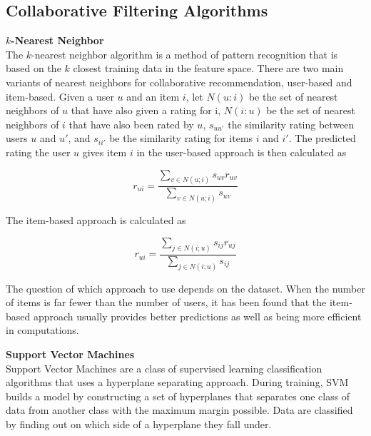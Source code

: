 \subsection{Collaborative Filtering Algorithms}

{\bf $k$-Nearest Neighbor}
\\

The $k$-nearest neighbor algorithm is a method of pattern recognition that is based on the $k$ closest training data in the feature space. There are two main variants of nearest neighbors for collaborative recommendation, user-based and item-based. Given a user $u$ and an item $i$, let $N(u:i)$ be the set of nearest neighbors of $u$ that have also given a rating for i, $N(i:u)$ be the set of nearest neighbors of $i$ that have also been rated by $u$, $s_{uu'}$ the similarity rating between users $u$ and $u'$, and $s_{ii'}$ be the similarity rating for items $i$ and $i'$. The predicted rating the user $u$ gives item $i$ in the user-based approach is then calculated as

\[
r_{ui} = \frac    {\sum_{v\in N(u;i)} {s_{uv}r_{uv}} } {\sum_{v\in N(u;i)}{s_{uv}}}
\]

The item-based approach is calculated as 

\[
r_{ui} = \frac    {\sum_{j\in N(i;u)} {s_{ij}r_{uj}} } {\sum_{j\in N(i;u)}{s_{ij}}}
\]

The question of which approach to use depends on the dataset. When the number of items is far fewer than the number of users, it has been found that the item-based approach usually provides better predictions as well as being more efficient in computations. 
\\

\begin{comment}
This applies to the MovieLens 1 Million dataset as well. For the MovieLens 100,000 dataset, the number of items is larger than the number of users, and the user-based approach has been found to perform better.
\end{comment}


{\bf Support Vector Machines}
\\

Support Vector Machines are a class of supervised learning classification algorithms that uses a hyperplane separating approach. During training, SVM builds a model by constructing a set of hyperplanes that separates one class of data from another class with the maximum margin possible. Data are classified by finding out on which side of a hyperplane they fall under.

